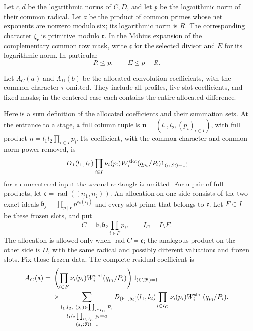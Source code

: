 \documentclass[12pt]{article}
\begin{document}
Let \(c,d\) be the logarithmic norms of \(C,D\), and let \(p\) be the logarithmic norm of
their common radical.  Let \(\mathfrak r\) be the product of common
primes whose net exponents are nonzero modulo six; its logarithmic
norm is \(R\).  The corresponding character
\(\xi_{\mathfrak r}\) is primitive modulo \(\mathfrak r\).
In the M\"obius expansion of the complementary common row mask,
write \(\mathfrak e\) for the selected divisor and \(E\) for its
logarithmic norm.  In particular
\[
 R\le p,\qquad E\le p-R.
\]

Let \(A_C(a)\) and \(A_D(b)\) be the allocated convolution
coefficients, with the common character \(\tau\) omitted.  They
include all profiles, live slot coefficients, and fixed masks; in
the centered case each contains the entire allocated difference.

Here is a sum definition of the allocated coefficients and their
summation sets.  At the entrance to a stage, a full column tuple is
\(\mathbf n=(l_1,l_2,(p_i)_{i\in I})\), with full product
\(n=l_1l_2\prod_{i\in I}p_i\).  Its coefficient, with the common
character and common norm power removed, is
\[
 D_{\mathbf 1}(l_1,l_2)\prod_{i\in I}
              \nu_i(p_i)W_i^{\rm slot}(q_{p_i}/P_i)
                 1_{(n,\mathfrak R)=1};
\]
for an uncentered input the second rectangle is omitted.
For a pair of full products, let
\(\mathfrak c=\operatorname{rad}((n_1,n_2))\).
An allocation on one side consists of the two exact ideals
\(\mathfrak b_j=\prod_{p\mid\mathfrak c}p^{v_p(l_j)}\)
and every slot prime that belongs to \(\mathfrak c\).
Let \(F\subset I\) be these frozen slots, and put
\[
 C=\mathfrak b_1\mathfrak b_2\prod_{i\in F}p_i,
 \qquad I_C=I\setminus F.
\]
The allocation is allowed only when \(\operatorname{rad}C=\mathfrak c\);
the analogous product on the other side is \(D\), with the same
radical and possibly different valuations and frozen slots.
Fix those frozen data.  The complete residual coefficient is
\begin{equation}\label{own:plain-allocation}
\begin{split}
 A_C(a)={}&
 \left(\prod_{i\in F}\nu_i(p_i)W_i^{\rm slot}(q_{p_i}/P_i)\right)
 1_{(C,\mathfrak R)=1}\\
 &{}\times
 \sum_{\substack{l_1,l_2,\ (p_i)\in\prod_{i\in I_C}\mathcal P_i\\
             l_1l_2\prod_{i\in I_C}p_i=a\\
             (a,\mathfrak c\mathfrak R)=1}}
 D_{(\mathfrak b_1,\mathfrak b_2)}(l_1,l_2)
       \prod_{i\in I_C}\nu_i(p_i)
                    W_i^{\rm slot}(q_{p_i}/P_i).
\end{split}
\end{equation}
\end{document}

